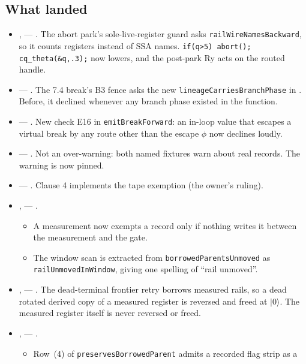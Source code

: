 \subsection*{What landed}
\begin{itemize}
  \item {},  --- . The abort
  park's sole-live-register guard asks \texttt{railWireNamesBackward}, so it counts
  registers instead of SSA names. \texttt{if(q>5) abort(); cq\_theta(\&q,.3);} now lowers,
  and the post-park Ry acts on the routed handle.
  \item {} --- . The 7.4 break's B3 fence asks
  the new \texttt{lineageCarriesBranchPhase} in . Before, it
  declined whenever any branch phase existed in the function.
  \item {} --- . New check E16 in
  \texttt{emitBreakForward}: an in-loop value that escapes a virtual break by any route
  other than the escape $\phi$ now declines loudly.
  \item {} --- . Not an over-warning: both named
  fixtures warn about real records. The warning is now pinned.
  \item {} --- . Clause 4 implements the tape
  exemption (the owner's ruling).
  \item {},  --- .
  \begin{itemize}
    \item A measurement now exempts a record only if nothing writes it between the
    measurement and the gate.
    \item The window scan is extracted from \texttt{borrowedParentsUnmoved} as
    \texttt{railUnmovedInWindow}, giving one spelling of ``rail unmoved''.
  \end{itemize}
  \item {},  --- . The
  dead-terminal frontier retry borrows measured rails, so a dead rotated derived copy of a
  measured register is reversed and freed at $|0\rangle$. The measured register itself is
  never reversed or freed.
  \item {},  --- .
  \begin{itemize}
    \item Row~(4) of \texttt{preservesBorrowedParent} admits a recorded flag strip as a

\end{itemize}
\end{itemize}
